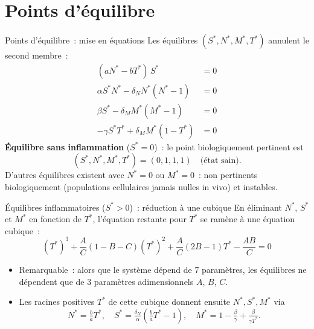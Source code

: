 \documentclass[aspectratio=169,12pt]{beamer}
\begin{document}
\section{Points d'équilibre}

\begin{frame}{Points d'équilibre~: mise en équations}
Les équilibres $(S^*,N^*,M^*,T^*)$ annulent le second membre~:
\begin{align*}
(a N^* - b T^*)\,S^* &= 0 \\
\alpha S^* N^* - \delta_N N^* (N^*-1) &= 0 \\
\beta S^* - \delta_M M^* (M^*-1) &= 0 \\
-\gamma S^* T^* + \delta_M M^* (1-T^*) &= 0
\end{align*}
\vspace{4pt}
\textbf{Équilibre sans inflammation} ($S^*=0$)~: le point \alert{biologiquement pertinent} est
\[
(S^*,N^*,M^*,T^*) = (0,1,1,1) \quad \text{(état sain)}.
\]
D'autres équilibres existent avec $N^*=0$ ou $M^*=0$~: non pertinents biologiquement (populations cellulaires jamais nulles in vivo) et instables.
\end{frame}

\begin{frame}{Équilibres inflammatoires ($S^*>0$)~: réduction à une cubique}
En éliminant $N^*$, $S^*$ et $M^*$ en fonction de $T^*$, l'équation restante pour $T^*$ se ramène à une \alert{équation cubique}~:
\[
{(T^*)}^3 + \frac{A}{C}\left(1-B-C\right)(T^*)^2 + \frac{A}{C}\left(2B-1\right) T^* - \frac{AB}{C} = 0
\]
\begin{itemize}
\item Remarquable~: alors que le système dépend de 7 paramètres, les équilibres ne dépendent que de \alert{3 paramètres adimensionnels} $A$, $B$, $C$.
\item Les racines positives $T^*$ de cette cubique donnent ensuite $N^*, S^*, M^*$ via
\[
N^* = \tfrac{b}{a}T^*, \quad S^* = \tfrac{\delta_N}{\alpha}\left(\tfrac{b}{a}T^*-1\right), \quad M^* = 1-\tfrac{\beta}{\gamma}+\tfrac{\beta}{\gamma T^*}.
\]
\end{itemize}
\end{frame}
\end{document}
